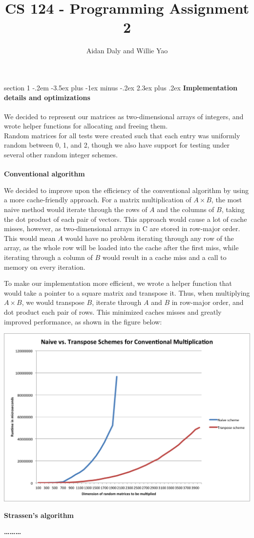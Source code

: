 \documentclass[12pt]{article}
\title{CS 124 - Programming Assignment 2}
\author{Aidan Daly and Willie Yao}
\makeatletter
\newenvironment{problem}{\@startsection
       {section}
       {1}
       {-.2em}
       {-3.5ex plus -1ex minus -.2ex}
       {2.3ex plus .2ex}
       {\pagebreak[3]%
       \large\bf\noindent{Problem }
       }
       }
       {%
       \begin{center}\large\bf \ldots\ldots\ldots\end{center}}
\makeatother
\begin{document}
\maketitle

\begin{problem}{}
\textbf{Implementation details and optimizations}\\
\\
We decided to represent our matrices as two-dimensional arrays of integers, and wrote helper functions for allocating and freeing them. \\
Random matrices for all tests were created such that each entry was uniformly random between 0, 1, and 2, though we also have support for testing under several other random integer schemes.\\
\\
\textbf{Conventional algorithm}

We decided to improve upon the efficiency of the conventional algorithm by using a more cache-friendly approach.  For a matrix multiplication of $A \times B$, the most naive method would iterate through the rows of $A$ and the columns of $B$, taking the dot product of each pair of vectors.  This approach would cause a lot of cache misses, however, as two-dimensional arrays in C are stored in row-major order.  This would mean $A$ would have no problem iterating through any row of the array, as the whole row will be loaded into the cache after the first miss, while iterating through a column of $B$ would result in a cache miss and a call to memory on every iteration.

To make our implementation more efficient, we wrote a helper function that would take a pointer to a square matrix and transpose it.  Thus, when multiplying $A \times B$, we would transpose $B$, iterate through $A$ and $B$ in row-major order, and dot product each pair of rows.  This minimized caches misses and greatly improved performance, as shown in the figure below:
\begin{center}
\includegraphics[scale=.70]{figs/conventional.png}
\end{center}
\textbf{Strassen's algorithm}


\end{problem}
\end{document}
